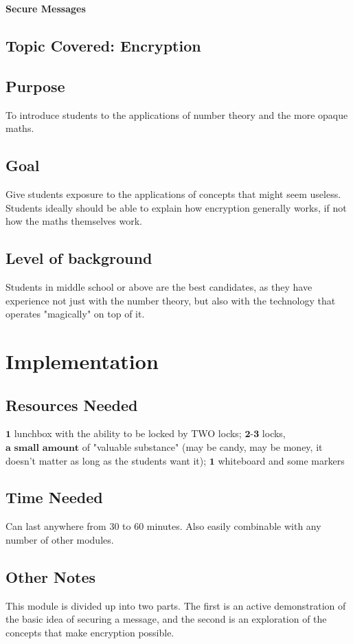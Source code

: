 \documentclass[a4paper]{article}
\begin{document}
\begin{center}
{\huge \textbf{Secure Messages}}
\subsection*{Topic Covered: Encryption}
\end{center}

\subsection*{Purpose}
To introduce students to the applications of number theory and the more opaque maths.

\subsection*{Goal}
Give students exposure to the applications of concepts that might seem useless. Students ideally should be able to explain how encryption generally works, if not how the maths themselves work.

\subsection*{Level of background}
Students in middle school or above are the best candidates, as they have experience not just with the number theory, but also with the technology that operates "magically" on top of it.

\section{Implementation}

\subsection*{Resources Needed}
$\textbf{1}$ lunchbox with the ability to be locked by TWO locks; $\textbf{2-3}$ locks, $\textbf{a small amount}$ of "valuable substance" (may be candy, may be money, it doesn't matter as long as the students want it); $\textbf{1}$ whiteboard and some markers

\subsection*{Time Needed}
Can last anywhere from 30 to 60 minutes. Also easily combinable with any number of other modules.

\subsection*{Other Notes}
This module is divided up into two parts. The first is an active demonstration of the basic idea of securing a message, and the second is an exploration of the concepts that make encryption possible.
\end{document}
